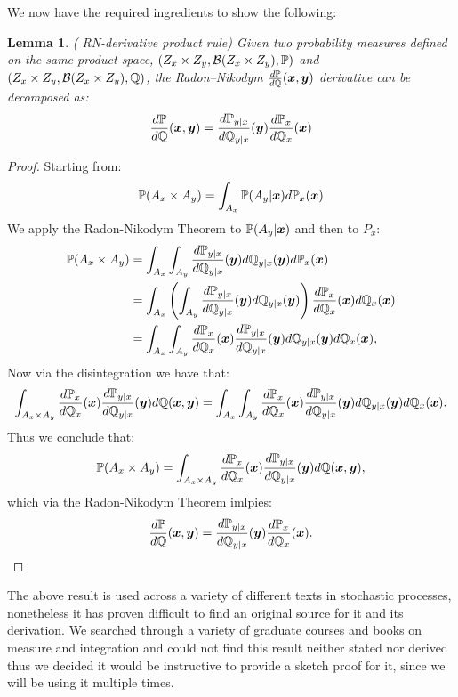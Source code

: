 \documentclass[a4paper,12pt,twoside,openright]{report}
\newtheorem{lemma}{Lemma}
\theoremstyle{definition}
\begin{document}
We now have the required ingredients to show the following:
\begin{lemma}\label{lemma:rn_des}( RN-derivative product rule)
Given two probability measures defined on the same product space,  $(Z_x \times Z_y, {\mathcal{B}}(Z_x \times Z_y) ,{\mathbb{P}})$ and $(Z_x \times Z_y, {\mathcal{B}}(Z_x \times Z_y) ,{\mathbb{Q}})$, the Radon–Nikodym $\frac{d{\mathbb{P}}}{d{\mathbb{Q}}} ({\bm{x}},{\bm{y}})$ derivative can be decomposed as:
\begin{align}
    \frac{d{\mathbb{P}}}{d{\mathbb{Q}}} ({\bm{x}},{\bm{y}}) = \frac{d{\mathbb{P}}_{y|x}}{d{\mathbb{Q}}_{y|x}}({\bm{y}})\frac{d{\mathbb{P}}_x}{d{\mathbb{Q}}_x}({\bm{x}})
\end{align}
\end{lemma}
\begin{proof}

Starting from:
\begin{align*}
    {\mathbb{P}}(A_x \times A_y) =  \int_{A_x}{\mathbb{P}}(A_y | {\bm{x}})  d{\mathbb{P}}_{x}({\bm{x}}) 
\end{align*}
We apply the Radon-Nikodym Theorem to ${\mathbb{P}}(A_y | {\bm{x}})$ and then to $P_x$:
\begin{align*}
    {\mathbb{P}}(A_x \times A_y) &=  \int_{A_x}\int_{A_y} \frac{d{\mathbb{P}}_{y|x}}{d{\mathbb{Q}}_{y|x}}({\bm{y}}) d{\mathbb{Q}}_{y|x}({\bm{y}}) d{\mathbb{P}}_{x}({\bm{x}}) \\
     &= \int_{A_x}\left(\int_{A_y} \frac{d{\mathbb{P}}_{y|x}}{d{\mathbb{Q}}_{y|x}}({\bm{y}}) d{\mathbb{Q}}_{y|x}({\bm{y}})\right) \frac{d{\mathbb{P}}_{x}}{d{\mathbb{Q}}_{x}}({\bm{x}})d{\mathbb{Q}}_{x}({\bm{x}}) \\
      &= \int_{A_x}\int_{A_y}\frac{d{\mathbb{P}}_{x}}{d{\mathbb{Q}}_{x}}({\bm{x}})\frac{d{\mathbb{P}}_{y|x}}{d{\mathbb{Q}}_{y|x}}({\bm{y}}) d{\mathbb{Q}}_{y|x}({\bm{y}}) d{\mathbb{Q}}_{x}({\bm{x}}),
\end{align*}
Now  via the disintegration we have that:
\begin{align*}
  \int_{A_x \times A_y} \frac{d{\mathbb{P}}_{x}}{d{\mathbb{Q}}_{x}}({\bm{x}})\frac{d{\mathbb{P}}_{y|x}}{d{\mathbb{Q}}_{y|x}}({\bm{y}}) d{\mathbb{Q}}({\bm{x}},{\bm{y}}) = \int_{A_x}\int_{A_y}\frac{d{\mathbb{P}}_{x}}{d{\mathbb{Q}}_{x}}({\bm{x}})\frac{d{\mathbb{P}}_{y|x}}{d{\mathbb{Q}}_{y|x}}({\bm{y}}) d{\mathbb{Q}}_{y|x}({\bm{y}}) d{\mathbb{Q}}_{x}({\bm{x}}).
\end{align*}
Thus we conclude that:
\begin{align*}
    {\mathbb{P}}(A_x \times A_y) = \int_{A_x \times A_y} \frac{d{\mathbb{P}}_{x}}{d{\mathbb{Q}}_{x}}({\bm{x}})\frac{d{\mathbb{P}}_{y|x}}{d{\mathbb{Q}}_{y|x}}({\bm{y}}) d{\mathbb{Q}}({\bm{x}},{\bm{y}}), 
\end{align*}
which via the Radon-Nikodym Theorem imlpies:
\begin{align*}
    \frac{d{\mathbb{P}}}{d{\mathbb{Q}}} ({\bm{x}},{\bm{y}}) = \frac{d{\mathbb{P}}_{y|x}}{d{\mathbb{Q}}_{y|x}}({\bm{y}})\frac{d{\mathbb{P}}_x}{d{\mathbb{Q}}_x}({\bm{x}}).
\end{align*}
\end{proof}
The above result is used across a variety of different texts in stochastic processes, nonetheless it has proven difficult to find an original source for it and its derivation. We searched through a variety of graduate courses and books on measure and integration and could not find this result neither stated nor derived thus we decided it would be instructive to provide a sketch proof for it, since we will be using it multiple times.
\end{document}
